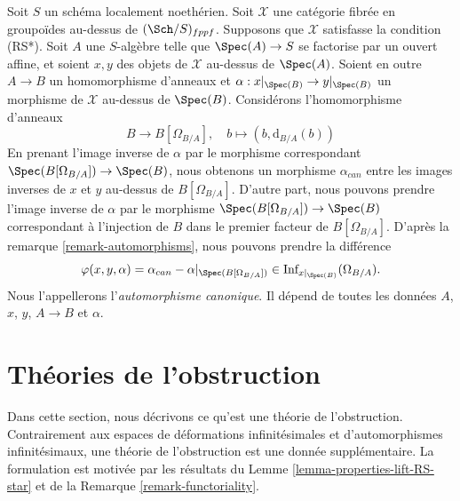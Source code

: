 \begin{remark}
\label{remark-canonical-isomorphism}
Soit $S$ un schéma localement noethérien. Soit $\mathcal{X}$ une catégorie
fibrée en groupoïdes au-dessus de $(\Sch/S)_{fppf}$. Supposons que $\mathcal{X}$ satisfasse
la condition (RS*). Soit $A$ une $S$-algèbre telle que
$\Spec(A) \to S$ se factorise par un ouvert affine, et soient $x, y$ des objets de
$\mathcal{X}$ au-dessus de $\Spec(A)$. Soient en outre $A \to B$ un homomorphisme d'anneaux et
$\alpha : x|_{\Spec(B)} \to y|_{\Spec(B)}$ un morphisme de
$\mathcal{X}$ au-dessus de $\Spec(B)$. Considérons l'homomorphisme d'anneaux
$$
B \longrightarrow B[\Omega_{B/A}],
\quad
b \longmapsto (b, \text{d}_{B/A}(b))
$$
En prenant l'image inverse de $\alpha$ par le morphisme correspondant
$\Spec(B[\Omega_{B/A}]) \to \Spec(B)$, nous obtenons un
morphisme $\alpha_{can}$ entre les images inverses de $x$ et $y$ au-dessus de
$B[\Omega_{B/A}]$. D'autre part, nous pouvons prendre l'image inverse de $\alpha$
par le morphisme $\Spec(B[\Omega_{B/A}]) \to \Spec(B)$ correspondant
à l'injection de $B$ dans le premier facteur de $B[\Omega_{B/A}]$.
D'après la remarque \ref{remark-automorphisms},
nous pouvons prendre la différence
$$
\varphi(x, y, \alpha) = \alpha_{can} - \alpha|_{\Spec(B[\Omega_{B/A}])} \in
\text{Inf}_{x|_{\Spec(B)}}(\Omega_{B/A}).
$$
Nous l'appellerons l'{\it automorphisme canonique}. Il dépend
de toutes les données $A$, $x$, $y$, $A \to B$ et $\alpha$.
\end{remark}





\section{Théories de l'obstruction}
\label{section-obstruction-theory}

\noindent
Dans cette section, nous décrivons ce qu'est une théorie de l'obstruction.
Contrairement aux espaces de déformations infinitésimales et d'automorphismes
infinitésimaux, une théorie de l'obstruction est une donnée supplémentaire.
La formulation est motivée par les résultats du
Lemme \ref{lemma-properties-lift-RS-star}
et de la Remarque \ref{remark-functoriality}.

